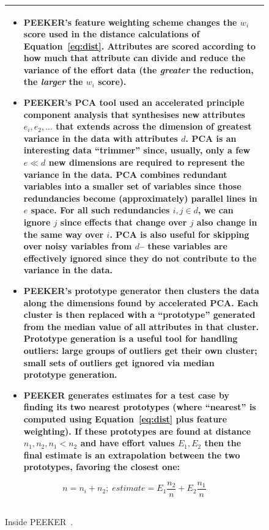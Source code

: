 \documentclass{sig-alternate}
\newcommand{\bi}{\begin{itemize}[leftmargin=0.4cm]}
\newcommand{\ei}{\end{itemize}}
\newcommand{\fig}[1]{Figure~\ref{fig:#1}}
\newcommand{\eq}[1]{Equation~\ref{eq:#1}}
\begin{document}
\begin{figure}[!t]
\small
\begin{tabular}{|p{.95\linewidth}|}\hline
\bi
\item
PEEKER's feature weighting scheme changes the $w_i$ score used in the distance 
calculations of \eq{dist}.
Attributes are scored according to how much that attribute
can divide and reduce the variance of the effort data (the {\em greater} the reduction, the
{\em larger} the $w_i$ score).  
\item
PEEKER's PCA tool used an accelerated   principle component analysis that synthesises  new
attributes $e_i, e_2,...$
that extends across the dimension of greatest  variance in the data  with attributes $d$.  
PCA is an interesting data ``trimmer'' since, usually,
only a few $e \ll d$ new dimensions are required to represent the variance in the data. 
PCA  combines
redundant  variables into a smaller set of variables since those
redundancies become (approximately) parallel lines
in $e$ space. For all such redundancies \mbox{$i,j \in d$}, we 
can ignore $j$ 
since effects that change over $j$ also
change in the same way over $i$.
PCA is also useful for skipping over noisy variables from $d$-- these
variables are effectively ignored since    they  do not contribute to the variance in the data.
\item
PEEKER's prototype generator then clusters the data along the dimensions
found by accelerated PCA. Each cluster is then replaced with a ``prototype'' generated from
the median value of all attributes in that cluster. Prototype generation is a useful tool for
handling outliers: large groups of outliers get their own cluster; small sets of outliers
get ignored via median prototype generation.
\item
PEEKER generates estimates for a test case by finding its two nearest prototypes   (where ``nearest''
is computed using \eq{dist} plus feature weighting). If these prototypes are found at distance
$n_1,n_2, n_1 < n_2$ and have effort values $E_1,E_2$ then the final estimate is an extrapolation
between the two prototypes, favoring the closest one:
\ei
\[
n=n_i+n_2;\;\mathit{estimate}=E_1\frac{n_2}{n} + E_2\frac{n_1}{n}
\]\\\hline
\end{tabular} 
\caption{Inside PEEKER~\cite{papa13}.}\label{fig:peeker}
\end{figure}




\end{document}
